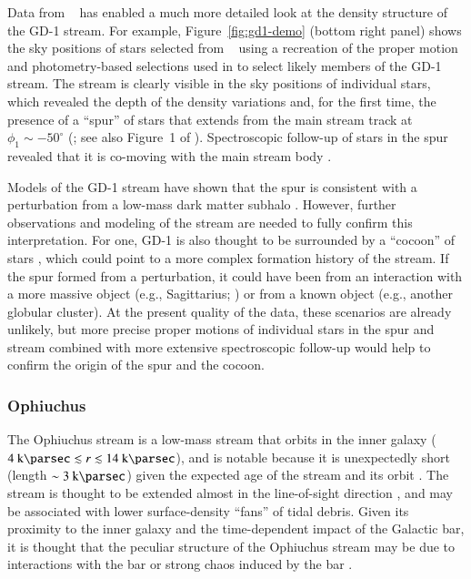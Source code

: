 \documentclass[final,5p,times,twocolumn,authoryear]{elsarticle}
\begin{document}
Data from \gaia\  has enabled a much more detailed look at the density structure
of the GD-1 stream.
For example, Figure~\ref{fig:gd1-demo} (bottom right panel) shows the sky positions of
stars selected from \gaia\  using a recreation of the proper motion and
photometry-based selections used in \citep{price-whelan:2018} to select likely members
of the GD-1 stream.
The stream is clearly visible in the sky positions of individual stars, which revealed
the depth of the density variations and, for the first time, the presence of a ``spur''
of stars that extends from the main stream track at $\phi_1 \sim -50^\circ$
(\citealt{price-whelan:2018}; see also Figure~1 of \citealt{bonaca:2019b}).
Spectroscopic follow-up of stars in the spur revealed that it is co-moving with the main
stream body \citep{bonaca:2020b}.

Models of the GD-1 stream have shown that the spur is consistent with a perturbation
from a low-mass dark matter subhalo \citep{bonaca:2019, bonaca:2020b}.
However, further observations and modeling of the stream are needed to fully confirm
this interpretation.
For one, GD-1 is also thought to be surrounded by a ``cocoon'' of stars
\citep{malhan:2019a}, which could point to a more complex formation history of the
stream.
If the spur formed from a perturbation, it could have been from an interaction with a
more massive object (e.g., Sagittarius; \citealt{dillamore:2022}) or from a known object
(e.g., another globular cluster).
At the present quality of the data, these scenarios are already unlikely, but more
precise proper motions of individual stars in the spur and stream combined with more
extensive spectroscopic follow-up would help to confirm the origin of the spur and the
cocoon.


\subsubsection{Ophiuchus}
\label{sec:ophiuchus}

The Ophiuchus stream is a low-mass stream that orbits in the inner galaxy ($4~\kpc
\lesssim r \lesssim 14~\kpc$), and is notable because it is unexpectedly short (length
$\sim 3~\kpc$) given the expected age of the stream and its orbit \citep{bernard:2014,
sesar:2015}.
The stream is thought to be extended almost in the line-of-sight direction
\citep{sesar:2016}, and may be associated with lower surface-density ``fans'' of tidal
debris.
Given its proximity to the inner galaxy and the time-dependent impact of the Galactic
bar, it is thought that the peculiar structure of the Ophiuchus stream may be due to
interactions with the bar or strong chaos induced by the bar \citep{sesar:2016,
price-whelan:2016b}.
\end{document}
